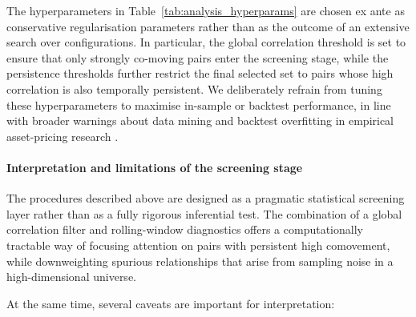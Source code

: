 \documentclass[11pt,a4paper]{article}
\begin{document}
The hyperparameters in Table~\ref{tab:analysis_hyperparams} are chosen ex ante
as conservative regularisation parameters rather than as the outcome of an
extensive search over configurations. In particular, the global correlation
threshold is set to ensure that only strongly co-moving pairs enter the
screening stage, while the persistence thresholds further restrict the final
selected set to pairs whose high correlation is also temporally persistent. We
deliberately refrain from tuning these hyperparameters to maximise in-sample or
backtest performance, in line with broader warnings about data mining and
backtest overfitting in empirical asset-pricing research
\cite{harvey2016and,bailey2017probability}.

\paragraph{Interpretation and limitations of the screening stage}

The procedures described above are designed as a pragmatic statistical screening
layer rather than as a fully rigorous inferential test. The combination of a
global correlation filter and rolling-window diagnostics offers a
computationally tractable way of focusing attention on pairs with persistent
high comovement, while downweighting spurious relationships that arise from
sampling noise in a high-dimensional universe.

At the same time, several caveats are important for interpretation:
\end{document}
